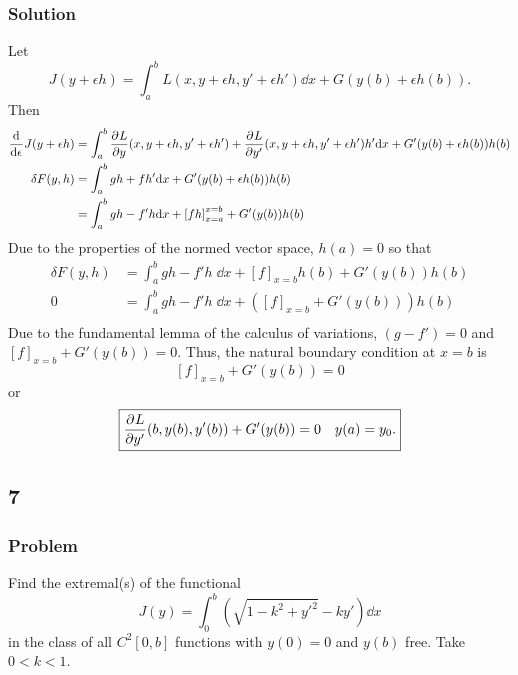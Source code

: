 \documentclass[12pt,twoside]{article}
\begin{document}
\subsubsection*{Solution}
Let
\begin{equation*}
  J(y+\epsilon h) = \int_a^b L(x,y+\epsilon h, y'+\epsilon h')\dd{x} + G(y(b) + \epsilon h(b)).
\end{equation*}
Then
\begin{align*}
  \frac{\mathrm{d}^{} {}}{\mathrm{d}{\epsilon}^{}} J(y+\epsilon h) &= \int_a^b\frac{\partial^{} {L}}{\partial {y}^{}}(x,y+\epsilon h, y'+\epsilon h') +
                                    \frac{\partial^{} {L}}{\partial {y'}^{}}(x,y+\epsilon h, y'+\epsilon h')h'\mathrm{d}{x} +
                                    G'(y(b)+\epsilon h(b))h(b) \\
  \delta F(y,h) &= \int_a^b g h + f h'\mathrm{d}{x} + G'(y(b)+\epsilon h(b))h(b) \\
  &= \int_a^b gh - f'h\mathrm{d}{x} + {[fh]}_{x=a}^{x=b} + G'(y(b))h(b) \\
\end{align*}
Due to the properties of the normed vector space, $h(a)=0$ so that
\begin{align*}
  \delta F(y,h) &= \int_a^b gh - f'h\;\dd{x} + {[f]}_{x=b}h(b) + G'(y(b))h(b) \\
  0 &= \int_a^b gh - f'h\;\dd{x} + ({[f]}_{x=b} + G'(y(b)))h(b) \\
\end{align*}
Due to the fundamental lemma of the calculus of variations, $(g-f')=0$ and
${[f]}_{x=b} + G'(y(b))=0$. Thus, the natural boundary condition at $x=b$ is
\begin{equation*}
  {[f]}_{x=b} + G'(y(b))=0
\end{equation*}
or
\begin{equation*}
  \boxed{\frac{\partial^{} {L}}{\partial {y'}^{}}(b,y(b),y'(b)) + G'(y(b)) = 0 \quad y(a)=y_0.}
\end{equation*}

\subsection{7}
\subsubsection*{Problem}
Find the extremal{(s)} of the functional
\begin{equation}
  \label{eq:7-problem}
  J(y)=\int_0^b(\sqrt{1-k^2+y'^2}-ky') \dd{x}
\end{equation}
in the class of all $C^2[0,b]$ functions with $y(0)=0$ and $y(b)$ free. Take
$0<k<1$.
\end{document}
